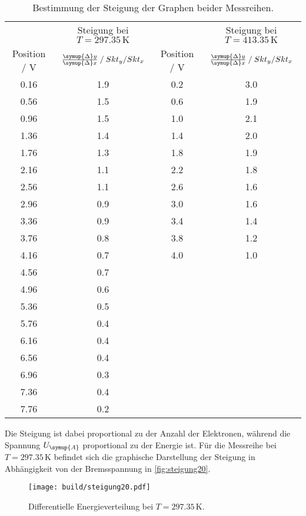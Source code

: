 \begin{table}
    \centering
    \caption{Bestimmung der Steigung der Graphen beider Messreihen.}
\begin{tabular}{c c | c c}
    \toprule
    & Steigung bei $T=297.35\,\unit{\kelvin}$ & & Steigung bei  $T=413.35\,\unit{\kelvin}$ \\
        Position / V & $\frac{\symup{\Delta}y}{\symup{\Delta}x} \mathbin{/} Skt_y/Skt_x$ &Position / V & $\frac{\symup{\Delta}y}{\symup{\Delta}x} \mathbin{/} Skt_y/Skt_x$ \\
    \midrule
    0.16 & 1.9 & 0.2 & 3.0 \\
    0.56 & 1.5 & 0.6 & 1.9 \\
    0.96 & 1.5 & 1.0 & 2.1 \\
    1.36 & 1.4 & 1.4 & 2.0 \\
    1.76 & 1.3 & 1.8 & 1.9 \\
    2.16 & 1.1 & 2.2 & 1.8 \\ 
    2.56 & 1.1 & 2.6 & 1.6 \\
    2.96 & 0.9 & 3.0 & 1.6 \\
    3.36 & 0.9 & 3.4 & 1.4 \\
    3.76 & 0.8 & 3.8 & 1.2 \\
    4.16 & 0.7 & 4.0 & 1.0 \\
    4.56 & 0.7 & &\\
    4.96 & 0.6 & &\\
    5.36 & 0.5 & &\\
    5.76 & 0.4 & &\\
    6.16 & 0.4 & &\\
    6.56 & 0.4 & &\\
    6.96 & 0.3 & &\\
    7.36 & 0.4 & &\\
    7.76 & 0.2 & &\\
     \bottomrule
    \end{tabular}
    \label{tab:steigung}
\end{table}

Die Steigung ist dabei proportional zu der Anzahl der Elektronen, während die Spannung $U_{\symup{A}}$ proportional zu der Energie ist. Für die Messreihe 
bei $T=297.35\,\unit{\kelvin}$ befindet sich die graphische Darstellung der Steigung in Abhängigkeit von der Bremsspannung in \autoref{fig:steigung20}.

\begin{figure}
    \centering
    \texttt{[image: build/steigung20.pdf]}
    \caption{Differentielle Energieverteilung bei $T=297.35\,\unit{\kelvin}$.}
    \label{fig:steigung20}
\end{figure}

